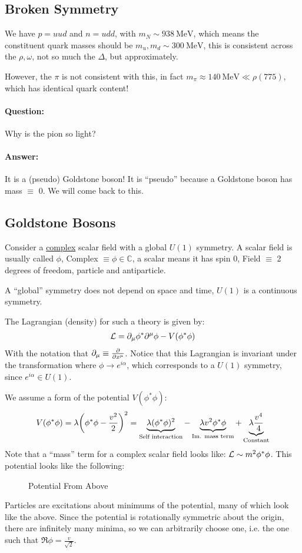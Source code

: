 \subsection{Broken Symmetry}
We have $p=uud$ and $n=udd$, with $m_N\sim\SI{938}{\MeV}$, which means the constituent quark masses should be $m_u,m_d\sim\SI{300}{\MeV}$, this is consistent across the $\rho,\omega$, not so much the $\Delta$, but approximately.

However, the $\pi$ is not consistent with this, in fact $m_\pi\approx\SI{140}{\MeV}\ll\rho(775)$, which has identical quark content!

\paragraph{Question:} Why is the pion so light?
\paragraph{Answer:} It is a (pseudo) Goldstone boson! It is ``pseudo'' because a Goldstone boson has mass $\equiv$ 0. We will come back to this.

\subsection{Goldstone Bosons}
Consider a \underline{complex} scalar field with a global $U(1)$ symmetry. A scalar field is usually called $\phi$, Complex $\equiv\phi\in\mathbb{C}$, a scalar means it has spin $0$, Field $\equiv$ 2 degrees of freedom, particle and antiparticle.

A ``global'' symmetry does not depend on space and time, $U(1)$ is a continuous symmetry.

The Lagrangian (density) for such a theory is given by:
\begin{align*}
  \mathcal{L}=\partial_\mu\phi^*\partial^\mu\phi-V(\phi^*\phi)
\end{align*}
With the notation that $\partial_\mu\equiv\pdv{x^\mu}$. Notice that this Lagrangian is invariant under the transformation where $\phi\to e^{i\alpha}$, which corresponds to a $U(1)$ symmetry, since $e^{i\alpha}\in U(1)$.

We assume a form of the potential $V(\phi^*\phi)$:
\begin{align*}
  V(\phi^*\phi)=\lambda\qty(\phi^*\phi-\frac{v^2}{2})^2=
  \underbrace{\lambda(\phi^*\phi)^2}_{\text{Self interaction}}
  -\underbrace{\lambda v^2\phi^*\phi}_{\text{Im. mass term}}
  +\underbrace{\lambda \frac{v^4}{4}}_{\text{Constant}}
\end{align*}
Note that a ``mass'' term for a complex scalar field looks like: $\mathcal{L}\sim m^2\phi^*\phi$. This potential looks like the following:
\begin{figure}[H]
  \centering
  \caption{Potential From Above}
  \label{fig:potential}
\end{figure}
Particles are excitations about minimums of the potential, many of which look like the above. Since the potential is rotationally symmetric about the origin, there are infinitely many minima, so we can arbitrarily choose one, i.e. the one such that $\Re\phi=\frac{v}{\sqrt{2}}$.

